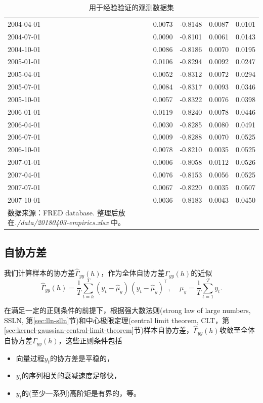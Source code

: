 \begin{longtable}{p{}|p{}p{}p{}p{}}
        2004-04-01	&0.0073	&-0.8148	&0.0087	&0.0101\\
        2004-07-01	&0.0090	&-0.8101	&0.0061	&0.0143\\
        2004-10-01	&0.0086	&-0.8186	&0.0070	&0.0195\\
        2005-01-01	&0.0106	&-0.8294	&0.0092	&0.0247\\
        2005-04-01	&0.0052	&-0.8312	&0.0072	&0.0294\\
        2005-07-01	&0.0084	&-0.8317	&0.0093	&0.0346\\
        2005-10-01	&0.0057	&-0.8322	&0.0076	&0.0398\\
        2006-01-01	&0.0119	&-0.8240	&0.0078	&0.0446\\
        2006-04-01	&0.0030	&-0.8285	&0.0080	&0.0491\\
        2006-07-01	&0.0009	&-0.8288	&0.0070	&0.0525\\
        2006-10-01	&0.0078	&-0.8210	&0.0035	&0.0525\\
        2007-01-01	&0.0006	&-0.8058	&0.0112	&0.0526\\
        2007-04-01	&0.0076	&-0.8153	&0.0056	&0.0525\\
        2007-07-01	&0.0067	&-0.8220	&0.0035	&0.0507\\
        2007-10-01	&0.0036	&-0.8183	&0.0043	&0.0450\\
        \hline
      \caption{用于经验验证的观测数据集}

      \small{数据来源：FRED database. 整理后放在\textit{./data/20180403-empirics.xlsx} 中。}
        \label{tab:stylized-ssrep-empirics-data}
\end{longtable}

\subsection{自协方差}
\label{sec:stylized-ssrep-empirics-var}

我们计算样本的协方差$\widehat{\Gamma}_{yy} \left(h \right)$，作为全体自协方差$\Gamma_{yy} \left(h \right)$的近似
\begin{equation}
  \label{eq:stylized-ssrep-empirics-autocovar}
  \widehat{\Gamma}_{yy} \left( h \right) = \frac{1}{T}
  \sum_{t=h}^{T} \left( y_{t} - \hat{\mu}_{y} \right) \,
  \left( y_{t} - \hat{\mu}_{y} \right)^{\top}, \quad \, \mu_{y} = \frac{1}{T} \sum_{t=1}^{T} y_{t}.
\end{equation}

在满足一定的正则条件的前提下，根据强大数法则(strong law of large numbers, SSLN, 第\ref{sec:lln-slln}节)和中心极限定理(central limit theorem, CLT，第\ref{sec:kernel-gaussian-central-limit-theorem}节)样本自协方差，$\widehat{\Gamma}_{yy} \left(h \right)$收敛至全体自协方差$\Gamma_{yy} \left(h \right)$，这些正则条件包括
\begin{itemize}
  \item 向量过程$y_{t}$的协方差是平稳的，
  \item $y_{t}$的序列相关的衰减速度足够快，
  \item $y_{t}$的(至少一系列)高阶矩是有界的，等。
\end{itemize}

